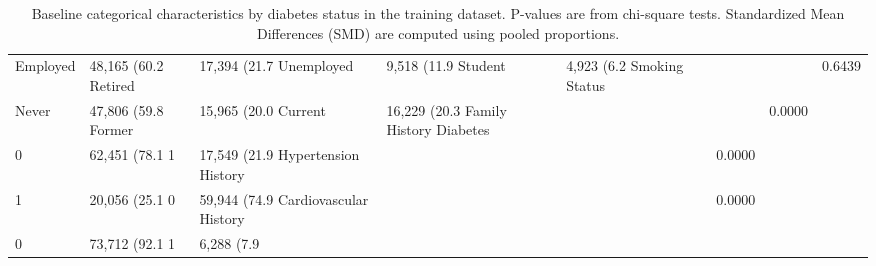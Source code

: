 \begin{table}[H]
\begin{center}
\begin{tabular}{llllll}
   Employed & 48,165 (60.2%
   Retired & 17,394 (21.7%
   Unemployed & 9,518 (11.9%
   Student & 4,923 (6.2%
Smoking Status &  &  &  & 0.6439 &  \\
   Never & 47,806 (59.8%
   Former & 15,965 (20.0%
   Current & 16,229 (20.3%
Family History Diabetes &  &  &  & 0.0000 &  \\
   0 & 62,451 (78.1%
   1 & 17,549 (21.9%
Hypertension History &  &  &  & 0.0000 &  \\
   1 & 20,056 (25.1%
   0 & 59,944 (74.9%
Cardiovascular History &  &  &  & 0.0000 &  \\
   0 & 73,712 (92.1%
   1 & 6,288 (7.9%
\bottomrule
\end{tabular}
\end{center}
\vspace{-5pt}
\caption{Baseline categorical characteristics by diabetes status in the training dataset. P-values are from chi-square tests. Standardized Mean Differences (SMD) are computed using pooled proportions.}
\label{tab:categorical_characteristics_by_diabetes_status}
\end{table}
